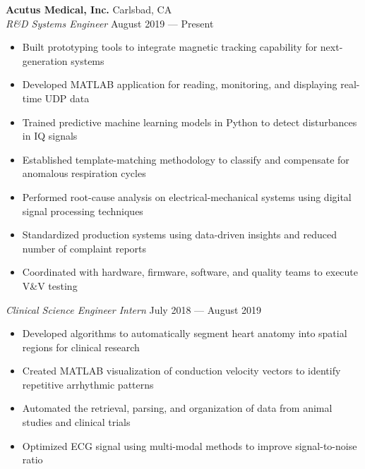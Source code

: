 \documentclass{article}
\begin{document}
\textbf{Acutus Medical, Inc.} \hfill Carlsbad, CA\\
\textit{R\&D Systems Engineer} \hfill August 2019 --- Present\\
\vspace{-2mm}
\begin{itemize} \itemsep 0.05pt
	\item Built prototyping tools to integrate magnetic tracking capability for next-generation systems
	\item Developed MATLAB application for reading, monitoring, and displaying real-time UDP data
	\item Trained predictive machine learning models in Python to detect disturbances in IQ signals
	\item Established template-matching methodology to classify and compensate for anomalous respiration cycles
	\item Performed root-cause analysis on electrical-mechanical systems using digital signal processing techniques
	\item Standardized production systems using data-driven insights and reduced number of complaint reports
	\item Coordinated with hardware, firmware, software, and quality teams to execute V\&V testing
\end{itemize}

\textit{Clinical Science Engineer Intern} \hfill July 2018 --- August 2019\\
\vspace{-2mm}
\begin{itemize} \itemsep 0.05pt
	\item Developed algorithms to automatically segment heart anatomy into spatial regions for clinical research
	\item Created MATLAB visualization of conduction velocity vectors to identify repetitive arrhythmic patterns
	\item Automated the retrieval, parsing, and organization of data from animal studies and clinical trials
	\item Optimized ECG signal using multi-modal methods to improve signal-to-noise ratio
\end{itemize}

\end{document}
